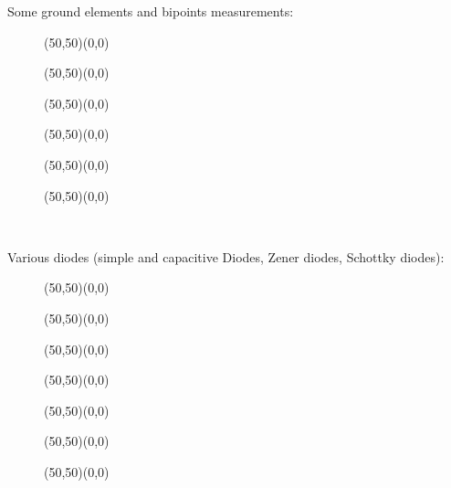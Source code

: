 	Some ground elements and bipoints measurements:
	\begin{figure}[H]
		\vspace{1cm}
		\begin{center}
		\begin{picture}(50,50)(0,0)
		\end{picture}
		\begin{picture}(50,50)(0,0)
		\end{picture}
		\begin{picture}(50,50)(0,0)
		\end{picture}
		\begin{picture}(50,50)(0,0)
		\end{picture}
		\begin{picture}(50,50)(0,0)
		\end{picture}
		\begin{picture}(50,50)(0,0)
		\end{picture}\\[2cm]
		\end{center}
	\end{figure}
	
	Various diodes (simple and capacitive Diodes, Zener diodes, Schottky diodes):
	\begin{figure}[H]
		\vspace{0.5cm}
		\begin{center}
		\begin{picture}(50,50)(0,0)
		\end{picture}
		\begin{picture}(50,50)(0,0)
		\end{picture}
		\begin{picture}(50,50)(0,0)
		\end{picture}
		\begin{picture}(50,50)(0,0)
		\end{picture}
		\begin{picture}(50,50)(0,0)
		\end{picture}
		\begin{picture}(50,50)(0,0)
		\end{picture}
		\begin{picture}(50,50)(0,0)
		\end{picture}
		\\[2cm]
		\end{center}
	\end{figure}
	
